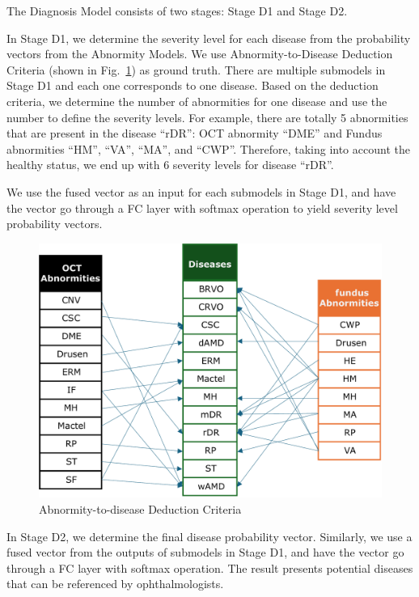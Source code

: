 \documentclass{article}
\begin{document}
	\vspace{0.5cm}
	
	The Diagnosis Model consists of two stages: Stage D1 and Stage D2. 
	
	\vspace{0.2cm}
	
	In Stage D1, we determine the severity level for each disease from the probability vectors from the Abnormity Models. We use Abnormity-to-Disease Deduction Criteria (shown in Fig.~\ref{fig:criteria}) as ground truth. There are multiple submodels in Stage D1 and each one corresponds to one disease. Based on the deduction criteria, we determine the number of abnormities for one disease and use the number to define the severity levels. For example, there are totally 5 abnormities that are present in the disease ``rDR'': OCT abnormity ``DME'' and Fundus abnormities ``HM'', ``VA'', ``MA'', and ``CWP''. Therefore, taking into account the healthy status, we end up with 6 severity levels for disease ``rDR''.

	We use the fused vector as an input for each submodels in Stage D1, and have the vector go through a FC layer with softmax operation to yield severity level probability vectors.
	
	\begin{figure}[htbp]
		\centering
		\includegraphics[width=0.8\linewidth]{Figs/criteria.pdf}
		\caption{Abnormity-to-disease Deduction Criteria}
		\vspace{0.3cm}
		\label{fig:criteria}
	\end{figure}

	\vspace{0.2cm}
	
	In Stage D2, we determine the final disease probability vector. Similarly, we use a fused vector from the outputs of submodels in Stage D1, and have the vector go through a FC layer with softmax operation. The result presents potential diseases that can be referenced by ophthalmologists.
\end{document}
